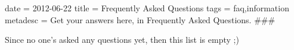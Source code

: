 date = 2012-06-22
title = Frequently Asked Questions
tags = faq,information
metadesc = Get your answers here, in Frequently Asked Questions.
###

Since no one's asked any questions yet, then this list is empty ;)

